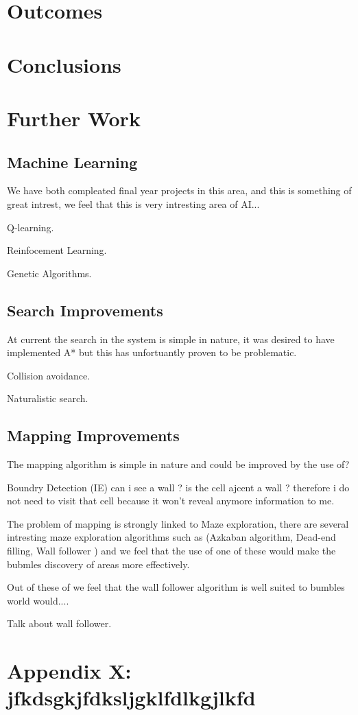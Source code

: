 \documentclass[a4paper,oneside]{report}
\begin{document}
	
\section{Outcomes}

\section{Conclusions}

\section{Further Work}

	\subsection{Machine Learning}
		We have both compleated final year projects in this area, and this is something of great intrest, we feel that this is very intresting area of AI...

		
		
		Q-learning.
		
		Reinfocement Learning.
		
		Genetic Algorithms. 
	
	\subsection{Search Improvements}
		At current the search in the system is simple in nature, it was desired to have implemented A* but this has unfortuantly proven to be problematic.
		
		Collision avoidance.
		
		Naturalistic search. 
		
	\subsection{Mapping Improvements}
		The mapping algorithm is simple in nature and could be improved by the use of? 
		
		Boundry Detection (IE) can i see a wall ? is the cell ajcent a wall ? therefore i do not need to visit that cell because it won't reveal anymore information to me. 
	
		The problem of mapping is strongly linked to Maze exploration, there are several intresting maze exploration algorithms such as (Azkaban algorithm, Dead-end filling, Wall follower ) and we feel that the use of one of these would make the bubmles discovery of areas more effectively. 
	
		Out of these of  we feel that the wall follower algorithm is well suited to bumbles world would.... 
		
		Talk about wall follower.

\appendix
\onehalfspace

\newpage
\section{Appendix X: jfkdsgkjfdksljgklfdlkgjlkfd}
\end{document}
